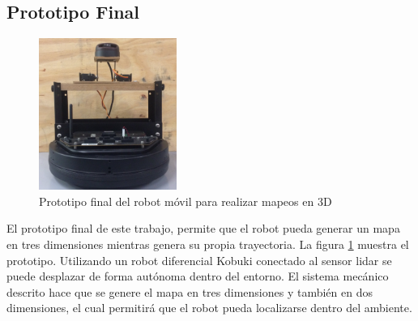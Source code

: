 \subsection{Prototipo Final}
\begin{figure}%
	\centering \footnotesize
	\includegraphics[width=0.40\textwidth]{images/kbkiReal3D.jpg}
	\captionsetup{font=footnotesize}
	\caption{Prototipo final del robot móvil para realizar mapeos en 3D}
	\label{fig:ProtoFinal}
\end{figure}
El prototipo final de este trabajo, permite que el robot pueda generar un mapa en tres dimensiones 
mientras genera su propia trayectoria. La figura \ref{fig:ProtoFinal} muestra el prototipo. Utilizando
un robot diferencial Kobuki conectado al sensor lidar se puede desplazar de forma autónoma
dentro del entorno. El sistema mecánico descrito hace que se genere el mapa en tres dimensiones
y también en dos dimensiones, el cual permitirá que el robot pueda localizarse dentro del ambiente.



